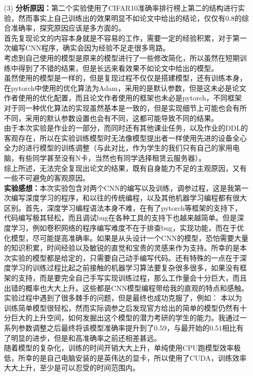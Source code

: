 \documentclass[a4paper,UTF8]{article}
\numberwithin{equation}{section}
\begin{document}
\begin{enumerate}
\item [(3)]
\textbf{分析原因：}第二个实验使用了CIFAR10准确率排行榜上第二的结构进行实验，然而事实上自己训练出的效果明显不如论文中给出的结论，仅仅有$0.8$的综合准确率，探究原因应该是多方面的。\\
首先复现论文的内容本身就是不容易的工作，需要一定的经验积累，对于第一次编写CNN程序，确实会因为经验不足走很多弯路。\\
考虑到自己使用的模型是原来的模型进行了一些修改简化，所以虽然在短期训练中得到了不错的结果，但是长远来看效果不如论文中给出的模型。\\
虽然使用的模型是一样的，但是复现过程不仅仅是搭建模型，还有训练本身，在pytorch中使用的优化算法为Adam，采用的是默认参数，但是这未必是论文作者使用的优化配置，而且论文作者使用的框架也未必是pytorch，不同框架对于同一种优化算法的实现虽然基本是一致的，但是实现细节上可能也会有所不同，采用的默认参数设置也会有不同，这都可能导致不同的结果。\\
由于本次实验是作业的一部分，而同时还有其他课业任务，以及作业的DDL的客观存在，所以在实验训练模型时无法像模型提出者一样使用先进的设备全心全力的进行模型的训练调整（与此对比，作为学生的我们只有自己的家用电脑，有些同学甚至没有N卡，当然也有同学选择租赁云服务器）。\\
综上所述，无法完全复现出论文的结果，既有自身能力不足的主观原因，又有一些不可避免的客观原因。\\
\textbf{实验感想：}本次实验包含对两个CNN的编写以及训练，调参过程，这是我第一次编写深度学习的程序，和以往的传统编程，以及其他机器学习编程都有很大区别。首先，深度学习编程语法本身不难，在有了pytorch等框架的支持下，代码编写极其轻松，而且调试bug在各种工具的支持下也越来越简单。但是深度学习，例如卷积网络的程序编写难度不在于排查bug，实现功能，而在于优化模型，尽可能提高准确率。如果是从头设计一个CNN的模型，恐怕需要大量的知识积累，时间经验以及敏锐的直觉和宝贵的灵感来作为支持。所幸的是本次实验的模型都是给定的，只需要自己动手编写代码。还有特殊的一点在于深度学习的训练过程比起之前接触的机器学习算法要复杂很多很多，如果没有框架的支持，而是要完全自己手写实现训练过程，那么工作量会十分巨大，而且出错的概率也大大上升。这些都是CNN模型编程带给我的直观的特点和感触。\\
实验过程中遇到了很多棘手的问题，但是最终也成功克服了，例如：
本以为训练简单模型很轻松，然而实际调参之后发现官方给出的简单的模型仍然有十分巨大的上升空间，如何发掘出这个模型的潜力考研的学生的能力。我通过一系列参数调整之后最终将该模型准确率提升到了0.59，与最开始的0.51相比有了明显的进步，但是和高准确率之前还相差甚远。\\
随着模型的复杂化，训练的时间开销大大上升，单纯使用CPU跑模型效率极低，所幸的是自己电脑安装的是英伟达的显卡，所以使用了CUDA，训练效率大大上升，至少是可以忍受的时间范围内。\\

\end{enumerate}
\end{document}
